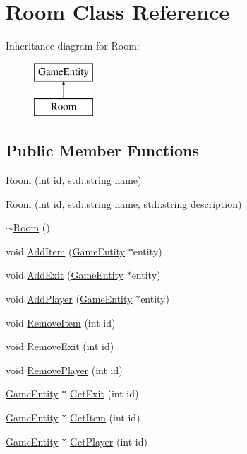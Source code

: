 \hypertarget{class_room}{}\section{Room Class Reference}
\label{class_room}
Inheritance diagram for Room\+:\begin{figure}[H]
\begin{center}
\leavevmode
\includegraphics[height=2.000000cm]{class_room}
\end{center}
\end{figure}
\subsection*{Public Member Functions}
\begin{DoxyCompactItemize}
\item 
\hyperlink{class_room_a18d9c7ed056c4bec868cf6939dc90aac}{Room} (int id, std\+::string name)
\item 
\hyperlink{class_room_a2286569deae9af3cafc5716ce72dcbf1}{Room} (int id, std\+::string name, std\+::string description)
\item 
\hyperlink{class_room_a67d5da09983cc53097807fd43ba5481a}{$\sim$\+Room} ()
\item 
void \hyperlink{class_room_a174291564fa1e50053230b844c9dc401}{Add\+Item} (\hyperlink{class_game_entity}{Game\+Entity} $\ast$entity)
\item 
void \hyperlink{class_room_a9d3ded2524dc65d34bcdac48ebfbca4f}{Add\+Exit} (\hyperlink{class_game_entity}{Game\+Entity} $\ast$entity)
\item 
void \hyperlink{class_room_acc80f8dea695a3eee94607fa83531c8c}{Add\+Player} (\hyperlink{class_game_entity}{Game\+Entity} $\ast$entity)
\item 
void \hyperlink{class_room_a2911ca54dcdcde1e2d483d039e01cc62}{Remove\+Item} (int id)
\item 
void \hyperlink{class_room_a18fe6c4958fe671bcb417bc8fa5b2f3a}{Remove\+Exit} (int id)
\item 
void \hyperlink{class_room_a218c9ab86637b3eadf36e51c71299765}{Remove\+Player} (int id)
\item 
\hyperlink{class_game_entity}{Game\+Entity} $\ast$ \hyperlink{class_room_af804da54d2d3649637bd0f9f7a3bf989}{Get\+Exit} (int id)
\item 
\hyperlink{class_game_entity}{Game\+Entity} $\ast$ \hyperlink{class_room_a71f95f978920afe3a2a991d8bcf394f3}{Get\+Item} (int id)
\item 
\hyperlink{class_game_entity}{Game\+Entity} $\ast$ \hyperlink{class_room_a2a3ab0dc562a3bd4ad61ebea0a8ced08}{Get\+Player} (int id)
\end{DoxyCompactItemize}


